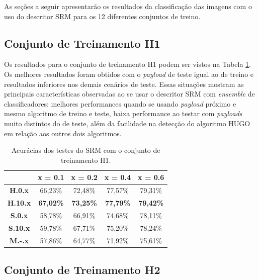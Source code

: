 As seções a seguir apresentarão os resultados da classificação das imagens com o uso do descritor SRM para os 12 diferentes conjuntos de treino.

\clearpage
\subsection{Conjunto de Treinamento H1}

Os resultados para o conjunto de treinamento H1 podem ser vistos na Tabela \ref{tab:srm_h1}. Os melhores resultados foram obtidos com o \textit{payload} de teste igual ao de treino e resultados inferiores nos demais cenários de teste. Essas situações mostram as principais características observadas ao se usar o descritor SRM com \textit{ensemble} de classificadores: melhores performances quando se usando \textit{payload} próximo e mesmo algoritmo de treino e teste, baixa performance ao testar com \textit{payloads} muito distintos do de teste, além da facilidade na detecção do algoritmo HUGO em relação aos outros dois algoritmos.

\begin{table}[!htb]
\centering
\begin{tabular}{c|c|c|c|c|}
\cline{2-5}
\textbf{}                             & \textbf{x = 0.1} & \textbf{x = 0.2} & \textbf{x = 0.4} & \textbf{x = 0.6} \\ \hline
\multicolumn{1}{|c|}{\textbf{H.0.x}}  & 66,23\%          & 72,48\%          & 77,57\%          & 79,31\%          \\ \hline
\multicolumn{1}{|c|}{\textbf{H.10.x}} & \textbf{67,02\%} & \textbf{73,25\%} & \textbf{77,79\%} & \textbf{79,42\%} \\ \hline
\multicolumn{1}{|c|}{\textbf{S.0.x}}  & 58,78\%          & 66,91\%          & 74,68\%          & 78,11\%          \\ \hline
\multicolumn{1}{|c|}{\textbf{S.10.x}} & 59,78\%          & 67,71\%         & 75,20\%          & 78,24\%          \\ \hline
\multicolumn{1}{|c|}{\textbf{M.-.x}}  & 57,86\%          & 64,77\%          & 71,92\%          & 75,61\%          \\ \hline
\end{tabular}
\caption{Acurácias dos testes do SRM com o conjunto de treinamento H1.}
\label{tab:srm_h1}
\end{table}


\subsection{Conjunto de Treinamento H2}

